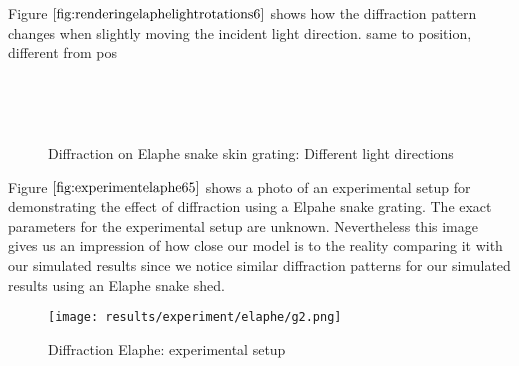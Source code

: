 Figure $\ref{fig:renderingelaphelightrotations6}$ shows how the diffraction pattern changes when slightly moving the incident light direction. same to position, different from pos

\begin{figure}[H]
  \centering
~
~
  
~
~
  
  
\caption{Diffraction on Elaphe snake skin grating: Different light directions}
\label{fig:renderingelaphelightrotations6}
\end{figure}

Figure $\ref{fig:experimentelaphe65}$ shows a photo of an experimental setup for demonstrating the effect of diffraction using a Elpahe snake grating. The exact parameters for the experimental setup are unknown. Nevertheless this image gives us an impression of how close our model is to the reality comparing it with our simulated results since we notice similar diffraction patterns for our simulated results using an Elaphe snake shed. 

\begin{figure}[H]
  \texttt{[image: results/experiment/elaphe/g2.png]}
  \caption{Diffraction Elaphe: experimental setup}
  \label{fig:experimentelaphe65}
\end{figure}

